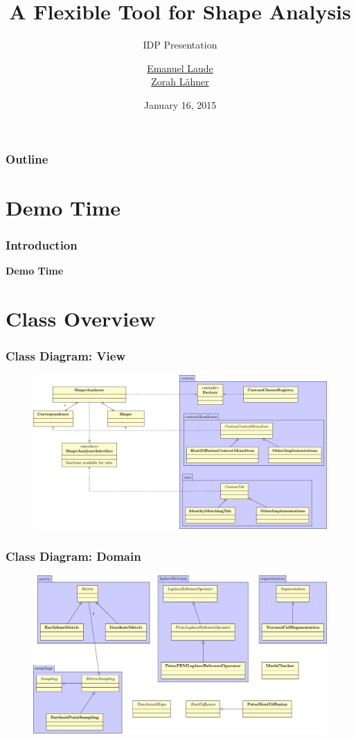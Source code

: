 \documentclass[compress]{beamer}
\title{A Flexible Tool for Shape Analysis}
\subtitle{IDP Presentation}
\author{\href{emanuel.laude@in.tum.de}{Emanuel Laude}\\ \href{laehner@in.tum.de}{Zorah L\"ahner} }
\date{January 16, 2015}
\institute{Technische Universit\"at M\"unchen}
\begin{document}
\begin{frame}
  \titlepage
\end{frame}

\begin{frame}
  \frametitle{Outline}
  \tableofcontents
\end{frame}

\section{Demo Time}

\begin{frame}
	\frametitle{Introduction}
	
	\bf{Demo Time}
	
\end{frame}

\section{Class Overview}

\begin{frame}
  \frametitle{Class Diagram: View}
  \begin{figure}[h]
	\centering
	\includegraphics[width=\textwidth]{diagram.pdf}
\end{figure}
\end{frame}

\begin{frame}
  \frametitle{Class Diagram: Domain}
  \begin{figure}[h]
	\centering
	\includegraphics[width=\textwidth]{diagram2.pdf}
\end{figure}
\end{frame}
\end{document}
